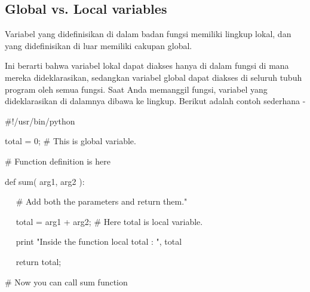 \documentclass[a4paper,12pt]{report}
\begin{document}
\subsection*{Global vs. Local variables}
 \par
\begin{adjustwidth}{0.03in}{0.03in}
Variabel yang didefinisikan di dalam badan fungsi memiliki lingkup lokal, dan yang didefinisikan di luar memiliki cakupan global.\end{adjustwidth}
 \par
\begin{adjustwidth}{0.03in}{0.03in}
Ini berarti bahwa variabel lokal dapat diakses hanya di dalam fungsi di mana mereka dideklarasikan, sedangkan variabel global dapat diakses di seluruh tubuh program oleh semua fungsi. Saat Anda memanggil fungsi, variabel yang dideklarasikan di dalamnya dibawa ke lingkup. Berikut adalah contoh sederhana -\end{adjustwidth}
 \par
\noindent 
 \hspace*{0.5in}  $  \#  $!/usr/bin/python \par
\vspace{12pt}
\noindent 
 \hspace*{0.5in} total = 0;  $  \#  $ This is global variable. \par
\noindent 
 \hspace*{0.5in}  $  \#  $ Function definition is here \par
\noindent 
 \hspace*{0.5in} def sum( arg1, arg2 ): \par
\noindent 
 \hspace*{0.5in} ~~  $  \#  $ Add both the parameters and return them." \par
\noindent 
 \hspace*{0.5in} ~~ total = arg1 + arg2;  $  \#  $ Here total is local variable. \par
\noindent 
 \hspace*{0.5in} ~~ print "Inside the function local total : ", total \par
\noindent 
 \hspace*{0.5in} ~~ return total; \par
\noindent 
 \hspace*{0.5in} \vspace{12pt}
\noindent 
 \hspace*{0.5in}  $  \#  $ Now you can call sum function \par
\noindent 
\end{document}
